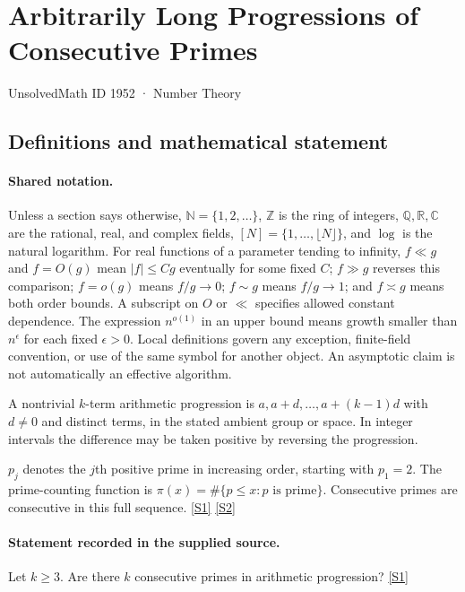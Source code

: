\documentclass[11pt,a4paper]{article}
\newcommand{\N}{\mathbb{N}}
\newcommand{\Z}{\mathbb{Z}}
\newcommand{\Q}{\mathbb{Q}}
\newcommand{\R}{\mathbb{R}}
\newcommand{\C}{\mathbb{C}}
\newcommand{\sref}[2]{\hyperlink{source:#1:#2}{[S#2]}}
\begin{document}

\setcounter{section}{1951}

\section{Arbitrarily Long Progressions of Consecutive Primes}\label{1952}

{\small\sffamily UnsolvedMath ID 1952 · Number Theory}

\subsection{Definitions and mathematical statement}

\paragraph{Shared notation.}Unless a section says otherwise, $\N=\{1,2,\ldots\}$,
$\Z$ is the ring of integers, $\Q,\R,\C$ are the rational, real, and complex
fields, $[N]=\{1,\ldots,\lfloor N\rfloor\}$, and $\log$ is the natural
logarithm. For real functions of a parameter tending to infinity,
$f\ll g$ and $f=O(g)$ mean $|f|\leq Cg$ eventually for some fixed $C$;
$f\gg g$ reverses this comparison; $f=o(g)$ means $f/g\to0$;
$f\sim g$ means $f/g\to1$; and $f\asymp g$ means both order bounds.
A subscript on $O$ or $\ll$ specifies allowed constant dependence.
The expression $n^{o(1)}$ in an upper bound means growth smaller than
$n^\epsilon$ for each fixed $\epsilon>0$. Local definitions govern any
exception, finite-field convention, or use of the same symbol for another
object. An asymptotic claim is not automatically an effective algorithm.



A nontrivial $k$-term arithmetic progression is $a,a+d,\ldots,a+(k-1)d$ with $d\ne0$ and distinct terms, in the stated ambient group or space. In integer intervals the difference may be taken positive by reversing the progression.

$p_j$ denotes the $j$th positive prime in increasing order, starting with $p_1=2$. The prime-counting function is $\pi(x)=\#\{p\leq x:p\text{ is prime}\}$. Consecutive primes are consecutive in this full sequence. \sref{1952}{1} \sref{1952}{2}

\paragraph{Statement recorded in the supplied source.}
Let $k\geq 3$. Are there $k$ consecutive primes in arithmetic progression? \sref{1952}{1}
\end{document}
